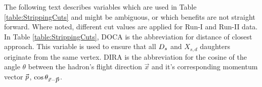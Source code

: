 The following text describes variables which are used in Table \ref{table:StrippingCuts} and might be ambiguous, or which benefits are not straight forward. 
Where noted, different cut values are applied for Run-I and Run-II data.
In Table \ref{table:StrippingCuts}, DOCA is the abbreviation for distance of closest approach. This variable is used to ensure that all ${{D}_{s}}$ and $X_{s,d}$ daughters originate from the same vertex.
DIRA is the abbreviation for the cosine of the angle $\theta$ between the hadron's flight direction $\vec{x}$ and it's corresponding momentum vector $\vec{\mbox{$p$}}$, $\cos{\theta_{\vec{x} -\vec{\mbox{$p$}}}}$.
